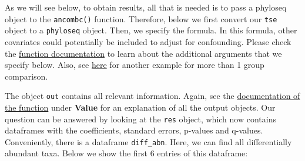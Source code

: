\documentclass[
  oneside]{book}
\newenvironment{Shaded}{\begin{snugshade}}{\end{snugshade}}
\newcommand{\AttributeTok}[1]{\textcolor[rgb]{0.77,0.63,0.00}{#1}}
\newcommand{\CommentTok}[1]{\textcolor[rgb]{0.56,0.35,0.01}{\textit{#1}}}
\newcommand{\ConstantTok}[1]{\textcolor[rgb]{0.00,0.00,0.00}{#1}}
\newcommand{\DecValTok}[1]{\textcolor[rgb]{0.00,0.00,0.81}{#1}}
\newcommand{\FloatTok}[1]{\textcolor[rgb]{0.00,0.00,0.81}{#1}}
\newcommand{\FunctionTok}[1]{\textcolor[rgb]{0.00,0.00,0.00}{#1}}
\newcommand{\NormalTok}[1]{#1}
\newcommand{\OtherTok}[1]{\textcolor[rgb]{0.56,0.35,0.01}{#1}}
\newcommand{\SpecialCharTok}[1]{\textcolor[rgb]{0.00,0.00,0.00}{#1}}
\newcommand{\StringTok}[1]{\textcolor[rgb]{0.31,0.60,0.02}{#1}}
\begin{document}
As we will see below, to obtain results, all that is needed is to pass
a phyloseq object to the \texttt{ancombc()} function. Therefore, below we first convert
our \texttt{tse} object to a \texttt{phyloseq} object. Then, we specify the formula. In this formula, other covariates could potentially be included to adjust for confounding.
Please check the \href{https://rdrr.io/github/FrederickHuangLin/ANCOMBC/man/ancombc.html}{function documentation}
to learn about the additional arguments that we specify below. Also, see \href{https://www.bioconductor.org/packages/release/bioc/vignettes/ANCOMBC/inst/doc/ANCOMBC.html}{here} for another example for more than 1 group comparison.

\begin{Shaded}
\end{Shaded}

The object \texttt{out} contains all relevant information. Again, see the
\href{https://rdrr.io/github/FrederickHuangLin/ANCOMBC/man/ancombc.html}{documentation of the function}
under \textbf{Value} for an explanation of all the output objects. Our question can be answered
by looking at the \texttt{res} object, which now contains dataframes with the coefficients,
standard errors, p-values and q-values. Conveniently, there is a dataframe \texttt{diff\_abn}.
Here, we can find all differentially abundant taxa. Below we show the first 6 entries of this dataframe:
\end{document}
